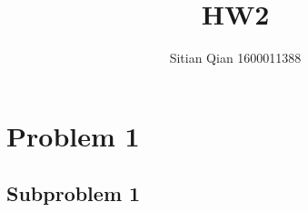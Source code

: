 \documentclass{article}
\begin{document}
    \title{HW2}
    \author{Sitian Qian 1600011388}
    \maketitle

    \section{Problem 1}
    \subsection{Subproblem 1}
    
    
\end{document}

